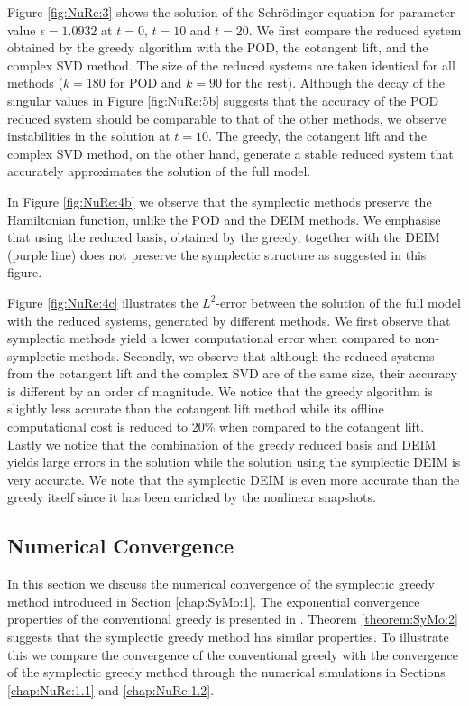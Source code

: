 Figure \ref{fig:NuRe:3} shows the solution of the Schr\"odinger equation for parameter value $\epsilon = 1.0932$ at $t=0$, $t=10$ and $t=20$. We first compare the reduced system obtained by the greedy algorithm with the POD, the cotangent lift, and the complex SVD method. The size of the reduced systems are taken identical for all methods ($k=180$ for POD and $k=90$ for the rest). Although the decay of the singular values in Figure \ref{fig:NuRe:5b} suggests that the accuracy of the POD reduced system should be comparable to that of the other methods, we observe instabilities in the solution at $t=10$. The greedy, the cotangent lift and the complex SVD method, on the other hand, generate a stable reduced system that accurately approximates the solution of the full model.

In Figure \ref{fig:NuRe:4b} we observe that the symplectic methods preserve the Hamiltonian function, unlike the POD and the DEIM methods. We emphasise that using the reduced basis, obtained by the greedy, together with the DEIM (purple line) does not preserve the symplectic structure as suggested in this figure.

Figure \ref{fig:NuRe:4c} illustrates the $L^2$-error between the solution of the full model with the reduced systems, generated by different methods. We first observe that symplectic methods yield a lower computational error when compared to non-symplectic methods. Secondly, we observe that although the reduced systems from the cotangent lift and the complex SVD are of the same size, their accuracy is different by an order of magnitude. We notice that the greedy algorithm is slightly less accurate than the cotangent lift method while its offline computational cost is reduced to 20\% when compared to the cotangent lift. Lastly we notice that the combination of the greedy reduced basis and DEIM yields large errors in the solution while the solution using the symplectic DEIM is very accurate. We note that the symplectic DEIM is even more accurate than the greedy itself since it has been enriched by the nonlinear snapshots. 

\subsection{Numerical Convergence} In this section we discuss the numerical convergence of the symplectic greedy method introduced in Section \ref{chap:SyMo:1}. The exponential convergence properties of the conventional greedy \cite{Quarteroni:2016wi} is presented in \cite{Buffa:2012iz,Binev:2011fj}. Theorem \ref{theorem:SyMo:2} suggests that the symplectic greedy method has similar properties. To illustrate this we compare the convergence of the conventional greedy with the convergence of the symplectic greedy method through the numerical simulations in Sections \ref{chap:NuRe:1.1} and \ref{chap:NuRe:1.2}. 


